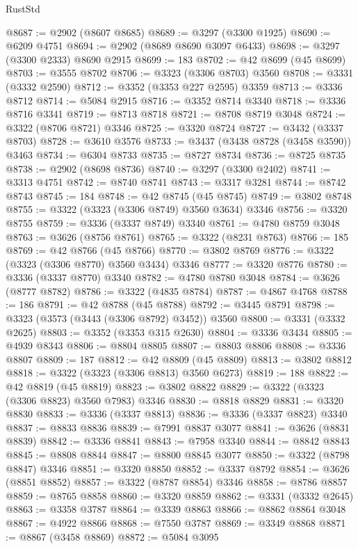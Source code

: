\begin{lexlean}{RustStd}
\begin{coremodule}
@8687 := @2902 (@8607 @8685)
@8689 := @3297 (@3300 @1925)
@8690 := @6209 @4751
@8694 := @2902 (@8689 @8690 @3097 @6433)
@8698 := @3297 (@3300 @2333) @8690 @2915
@8699 := 183
@8702 := @42 @8699 (@45 @8699)
@8703 := @3555 @8702
@8706 := @3323 (@3306 @8703) @3560
@8708 := @3331 (@3332 @2590)
@8712 := @3352 (@3353 @227 @2595) @3359
@8713 := @3336 @8712
@8714 := @5084 @2915
@8716 := @3352 @8714 @3340
@8718 := @3336 @8716 @3341
@8719 := @8713 @8718
@8721 := @8708 @8719 @3048
@8724 := @3322 (@8706 @8721) @3346
@8725 := @3320 @8724
@8727 := @3432 (@3337 @8703)
@8728 := @3610 @3576
@8733 := @3437 (@3438 @8728 (@3458 @3590)) @3463
@8734 := @6304 @8733
@8735 := @8727 @8734
@8736 := @8725 @8735
@8738 := @2902 (@8698 @8736)
@8740 := @3297 (@3300 @2402)
@8741 := @3313 @4751
@8742 := @8740 @8741
@8743 := @3317 @3281
@8744 := @8742 @8743
@8745 := 184
@8748 := @42 @8745 (@45 @8745)
@8749 := @3802 @8748
@8755 := @3322 (@3323 (@3306 @8749) @3560 @3634) @3346
@8756 := @3320 @8755
@8759 := @3336 (@3337 @8749) @3340
@8761 := @4780 @8759 @3048
@8763 := @3626 (@8756 @8761)
@8765 := @3322 (@8231 @8763)
@8766 := 185
@8769 := @42 @8766 (@45 @8766)
@8770 := @3802 @8769
@8776 := @3322 (@3323 (@3306 @8770) @3560 @3434) @3346
@8777 := @3320 @8776
@8780 := @3336 (@3337 @8770) @3340
@8782 := @4780 @8780 @3048
@8784 := @3626 (@8777 @8782)
@8786 := @3322 (@4835 @8784)
@8787 := @4867 @4768
@8788 := 186
@8791 := @42 @8788 (@45 @8788)
@8792 := @3445 @8791
@8798 := @3323 (@3573 (@3443 (@3306 @8792) @3452)) @3560
@8800 := @3331 (@3332 @2625)
@8803 := @3352 (@3353 @315 @2630)
@8804 := @3336 @3434
@8805 := @4939 @8343
@8806 := @8804 @8805
@8807 := @8803 @8806
@8808 := @3336 @8807
@8809 := 187
@8812 := @42 @8809 (@45 @8809)
@8813 := @3802 @8812
@8818 := @3322 (@3323 (@3306 @8813) @3560 @6273)
@8819 := 188
@8822 := @42 @8819 (@45 @8819)
@8823 := @3802 @8822
@8829 := @3322 (@3323 (@3306 @8823) @3560 @7983) @3346
@8830 := @8818 @8829
@8831 := @3320 @8830
@8833 := @3336 (@3337 @8813)
@8836 := @3336 (@3337 @8823) @3340
@8837 := @8833 @8836
@8839 := @7991 @8837 @3077
@8841 := @3626 (@8831 @8839)
@8842 := @3336 @8841
@8843 := @7958 @3340
@8844 := @8842 @8843
@8845 := @8808 @8844
@8847 := @8800 @8845 @3077
@8850 := @3322 (@8798 @8847) @3346
@8851 := @3320 @8850
@8852 := @3337 @8792
@8854 := @3626 (@8851 @8852)
@8857 := @3322 (@8787 @8854) @3346
@8858 := @8786 @8857
@8859 := @8765 @8858
@8860 := @3320 @8859
@8862 := @3331 (@3332 @2645)
@8863 := @3358 @3787
@8864 := @3339 @8863
@8866 := @8862 @8864 @3048
@8867 := @4922 @8866
@8868 := @7550 @3787
@8869 := @3349 @8868
@8871 := @8867 (@3458 @8869)
@8872 := @5084 @3095

\end{coremodule}
\end{lexlean}
